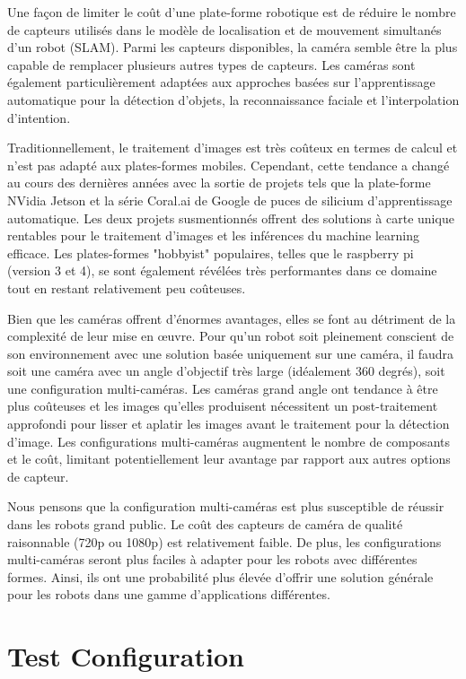 \documentclass[conference]{IEEEtran}
\begin{document}
Une façon de limiter le coût d'une plate-forme robotique est de réduire le nombre de capteurs utilisés dans le modèle de localisation et de mouvement simultanés d'un robot (SLAM). Parmi les capteurs disponibles, la caméra semble être la plus capable de remplacer plusieurs autres types de capteurs. Les caméras sont également particulièrement adaptées aux approches basées sur l'apprentissage automatique pour la détection d'objets, la reconnaissance faciale et l'interpolation d'intention.

Traditionnellement, le traitement d'images est très coûteux en termes de calcul et n'est pas adapté aux plates-formes mobiles. Cependant, cette tendance a changé au cours des dernières années avec la sortie de projets tels que la plate-forme NVidia Jetson et la série Coral.ai de Google de puces de silicium d'apprentissage automatique. Les deux projets susmentionnés offrent des solutions à carte unique rentables pour le traitement d'images et les inférences du machine learning efficace\cite{b5}. Les plates-formes "hobbyist" populaires, telles que le raspberry pi (version 3 et 4), se sont également révélées très performantes dans ce domaine tout en restant relativement peu coûteuses\cite{b6}.

Bien que les caméras offrent d'énormes avantages, elles se font au détriment de la complexité de leur mise en œuvre. Pour qu'un robot soit pleinement conscient de son environnement avec une solution basée uniquement sur une caméra, il faudra soit une caméra avec un angle d'objectif très large (idéalement 360 degrés), soit une configuration multi-caméras. Les caméras grand angle ont tendance à être plus coûteuses et les images qu'elles produisent nécessitent un post-traitement approfondi pour lisser et aplatir les images avant le traitement pour la détection d'image. Les configurations multi-caméras augmentent le nombre de composants et le coût, limitant potentiellement leur avantage par rapport aux autres options de capteur\cite{b7}.

Nous pensons que la configuration multi-caméras est plus susceptible de réussir dans les robots grand public. Le coût des capteurs de caméra de qualité raisonnable (720p ou 1080p) est relativement faible. De plus, les configurations multi-caméras seront plus faciles à adapter pour les robots avec différentes formes. Ainsi, ils ont une probabilité plus élevée d'offrir une solution générale pour les robots dans une gamme d'applications différentes.


\section{Test Configuration}
\end{document}

